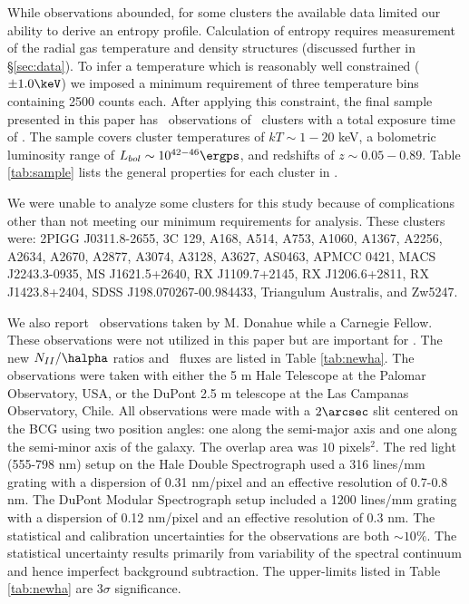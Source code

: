\documentclass{emulateapj}
\begin{document}
While observations abounded, for some clusters the available data
limited our ability to derive an entropy profile. Calculation of
entropy requires measurement of the radial gas temperature and density
structures (discussed further in \S\ref{sec:data}). To infer a
temperature which is reasonably well constrained ($\pm 1.0 \keV$) we
imposed a minimum requirement of three temperature bins containing
2500 counts each. After applying this constraint, the final sample
presented in this paper has \numobs\ observations of \numcluster\
clusters with a total exposure time of \expt. The sample covers
cluster temperatures of $kT \sim 1-20$ keV, a bolometric luminosity
range of $L_{bol} \sim 10^{42-46} \ergps$, and redshifts of $z \sim
0.05-0.89$. Table \ref{tab:sample} lists the general properties for
each cluster in \accept.

We were unable to analyze some clusters for this study because of
complications other than not meeting our minimum requirements for
analysis. These clusters were: 2PIGG J0311.8-2655, 3C 129, A168, A514,
A753, A1060, A1367, A2256, A2634, A2670, A2877, A3074, A3128, A3627,
AS0463, APMCC 0421, MACS J2243.3-0935, MS J1621.5+2640, RX
J1109.7+2145, RX J1206.6+2811, RX J1423.8+2404, SDSS
J198.070267-00.984433, Triangulum Australis, and Zw5247.

We also report \halpha\ observations taken by M. Donahue while a
Carnegie Fellow. These observations were not utilized in this paper
but are important for \cite{haradent}. The new $N_{II}/\halpha$ ratios
and \halpha\ fluxes are listed in Table \ref{tab:newha}. The
observations were taken with either the 5 m Hale Telescope at the
Palomar Observatory, USA, or the DuPont 2.5 m telescope at the Las
Campanas Observatory, Chile. All observations were made with a
$2\arcsec$ slit centered on the BCG using two position angles: one
along the semi-major axis and one along the semi-minor axis of the
galaxy. The overlap area was $10$ pixels$^2$. The red light (555-798
nm) setup on the Hale Double Spectrograph used a 316 lines/mm grating
with a dispersion of 0.31 nm/pixel and an effective resolution of
0.7-0.8 nm. The DuPont Modular Spectrograph setup included a 1200
lines/mm grating with a dispersion of 0.12 nm/pixel and an effective
resolution of 0.3 nm. The statistical and calibration uncertainties
for the observations are both $\sim 10\%$. The statistical uncertainty
results primarily from variability of the spectral continuum and hence
imperfect background subtraction. The upper-limits listed in Table
\ref{tab:newha} are $3\sigma$ significance.
\end{document}
